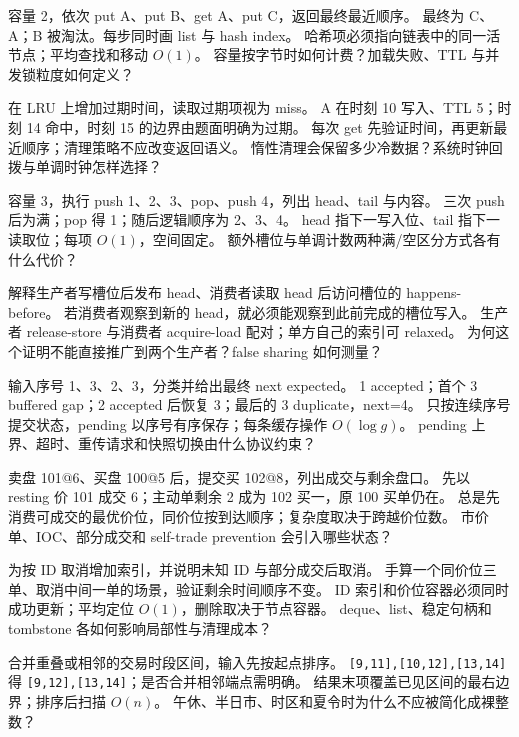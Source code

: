 {容量 2，依次 put A、put B、get A、put C，返回最终最近顺序。}
{最终为 C、A；B 被淘汰。每步同时画 list 与 hash index。}
{哈希项必须指向链表中的同一活节点；平均查找和移动 \(O(1)\)。}
{容量按字节时如何计费？加载失败、TTL 与并发锁粒度如何定义？}

{在 LRU 上增加过期时间，读取过期项视为 miss。}
{A 在时刻 10 写入、TTL 5；时刻 14 命中，时刻 15 的边界由题面明确为过期。}
{每次 get 先验证时间，再更新最近顺序；清理策略不应改变返回语义。}
{惰性清理会保留多少冷数据？系统时钟回拨与单调时钟怎样选择？}

{容量 3，执行 push 1、2、3、pop、push 4，列出 head、tail 与内容。}
{三次 push 后为满；pop 得 1；随后逻辑顺序为 2、3、4。}
{head 指下一写入位、tail 指下一读取位；每项 \(O(1)\)，空间固定。}
{额外槽位与单调计数两种满/空区分方式各有什么代价？}

{解释生产者写槽位后发布 head、消费者读取 head 后访问槽位的 happens-before。}
{若消费者观察到新的 head，就必须能观察到此前完成的槽位写入。}
{生产者 release-store 与消费者 acquire-load 配对；单方自己的索引可 relaxed。}
{为何这个证明不能直接推广到两个生产者？false sharing 如何测量？}

{输入序号 1、3、2、3，分类并给出最终 next expected。}
{1 accepted；首个 3 buffered gap；2 accepted 后恢复 3；最后的 3 duplicate，next=4。}
{只按连续序号提交状态，pending 以序号有序保存；每条缓存操作 \(O(\log g)\)。}
{pending 上界、超时、重传请求和快照切换由什么协议约束？}

{卖盘 101@6、买盘 100@5 后，提交买 102@8，列出成交与剩余盘口。}
{先以 resting 价 101 成交 6；主动单剩余 2 成为 102 买一，原 100 买单仍在。}
{总是先消费可成交的最优价位，同价位按到达顺序；复杂度取决于跨越价位数。}
{市价单、IOC、部分成交和 self-trade prevention 会引入哪些状态？}

{为按 ID 取消增加索引，并说明未知 ID 与部分成交后取消。}
{手算一个同价位三单、取消中间一单的场景，验证剩余时间顺序不变。}
{ID 索引和价位容器必须同时成功更新；平均定位 \(O(1)\)，删除取决于节点容器。}
{deque、list、稳定句柄和 tombstone 各如何影响局部性与清理成本？}

{合并重叠或相邻的交易时段区间，输入先按起点排序。}
{\texttt{[9,11],[10,12],[13,14]} 得 \texttt{[9,12],[13,14]}；是否合并相邻端点需明确。}
{结果末项覆盖已见区间的最右边界；排序后扫描 \(O(n)\)。}
{午休、半日市、时区和夏令时为什么不应被简化成裸整数？}

